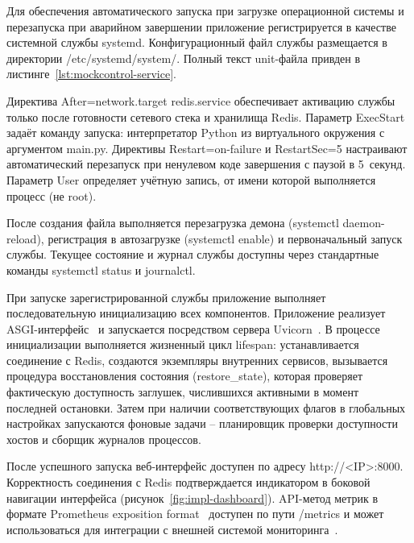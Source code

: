 
Для обеспечения автоматического запуска при загрузке операционной системы и перезапуска при аварийном завершении приложение регистрируется в качестве системной службы systemd. Конфигурационный файл службы размещается в директории /etc/systemd/system/. Полный текст unit-файла привден в листинге~\ref{lst:mockcontrol-service}.

Директива After=network.target redis.service обеспечивает активацию службы только после готовности сетевого стека и хранилища Redis. Параметр ExecStart задаёт команду запуска: интерпретатор Python из виртуального окружения с аргументом main.py. Директивы Restart=on-failure и RestartSec=5 настраивают автоматический перезапуск при ненулевом коде завершения с паузой в 5~секунд. Параметр User определяет учётную запись, от имени которой выполняется процесс (не root).

После создания файла выполняется перезагрузка демона (systemctl daemon-reload), регистрация в автозагрузке (systemctl enable) и первоначальный запуск службы. Текущее состояние и журнал службы доступны через стандартные команды systemctl status и journalctl.


При запуске зарегистрированной службы приложение выполняет последовательную инициализацию всех компонентов. Приложение реализует ASGI-интерфейс~\cite{asgi-spec} и запускается посредством сервера Uvicorn~\cite{uvicorn}. В процессе инициализации выполняется жизненный цикл lifespan: устанавливается соединение с Redis, создаются экземпляры внутренних сервисов, вызывается процедура восстановления состояния (restore\_state), которая проверяет фактическую доступность заглушек, числившихся активными в момент последней остановки. Затем при наличии соответствующих флагов в глобальных настройках запускаются фоновые задачи -- планировщик проверки доступности хостов и сборщик журналов процессов.

После успешного запуска веб-интерфейс доступен по адресу http://<IP>:8000. Корректность соединения с Redis подтверждается индикатором в боковой навигации интерфейса (рисунок~\ref{fig:impl-dashboard}). API-метод метрик в формате Prometheus exposition format~\cite{prometheus-exposition} доступен по пути /metrics и может использоваться для интеграции с внешней системой мониторинга~\cite{prometheus-docs, turnbull-prometheus}.


